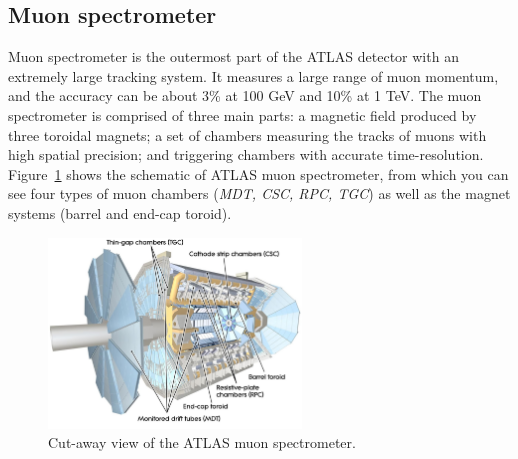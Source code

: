 \subsection{Muon spectrometer}

Muon spectrometer is the outermost part of the ATLAS detector with an extremely large tracking system.
It measures a large range of muon momentum, and the accuracy can be about 3\% at 100 GeV and 10\% at 1 TeV.
The muon spectrometer is comprised of three main parts: a magnetic field produced by three toroidal magnets;
a set of chambers measuring the tracks of muons with high spatial precision; and triggering chambers with accurate time-resolution. 
Figure~\ref{fig:muon_dec} shows the schematic of ATLAS muon spectrometer, from which you can see four types of muon chambers 
(\textit{MDT, CSC, RPC, TGC}) as well as the magnet systems (barrel and end-cap toroid).
\begin{figure}[!htb]
  \centering
  \includegraphics[width=0.6\textwidth]{figures/Detector/muon_all.png}
  \caption{Cut-away view of the ATLAS muon spectrometer\cite{Sliwa:2013oua}.}
  \label{fig:muon_dec}
\end{figure}


